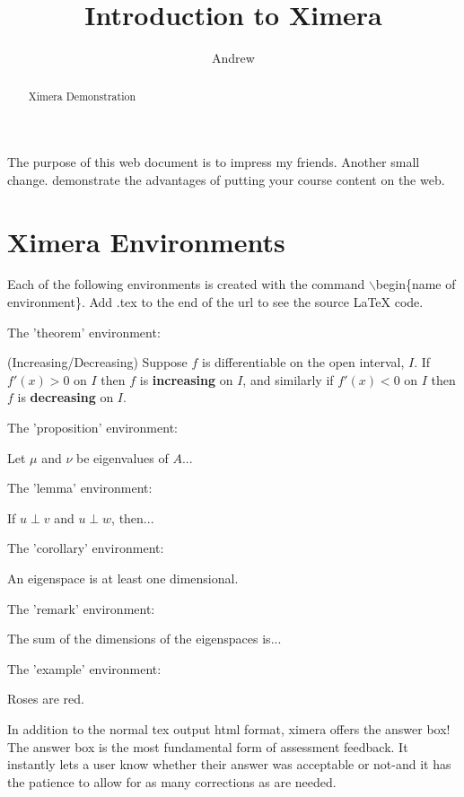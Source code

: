 \documentclass{ximera}
\title{Introduction to Ximera}
\author{Andrew}
\begin{document}
\begin{abstract}
    Ximera Demonstration
\end{abstract}


\maketitle

The purpose of this web document is to impress my friends.
Another small change.
demonstrate the advantages of putting your course content on the web.

\section{Ximera Environments}

Each of the following environments is created with the command $\backslash$begin\{name of environment\}.
Add .tex to the end of the url to see the source LaTeX code.

The 'theorem' environment:
\begin{theorem}(Increasing/Decreasing)
    Suppose $f$ is differentiable on the open interval, $I$. If $f'(x) >0$ on $I$ then $f$ is {\bf increasing} on $I$, and similarly
    if $f'(x) <0$ on $I$ then $f$ is {\bf decreasing} on $I$.
\end{theorem}

The 'proposition' environment:
\begin{proposition}
    Let $\mu$ and $\nu$ be eigenvalues of $A$...
\end{proposition}

The 'lemma' environment:
\begin{lemma}
    If $u \perp v$ and $u \perp w$, then...
\end{lemma}

The 'corollary' environment:
\begin{corollary}
    An eigenspace is at least one dimensional.
\end{corollary}

The 'remark' environment:
\begin{remark}
    The sum of the dimensions of the eigenspaces is...
\end{remark}

The 'example' environment:
\begin{example}
    Roses are red.
\end{example}
In addition to the normal tex output html format, ximera offers the answer box! The answer box is the most fundamental form of assessment feedback. It instantly lets a user know whether their answer was acceptable or not-and it has the patience to allow for as many corrections as are needed.
\end{document}
